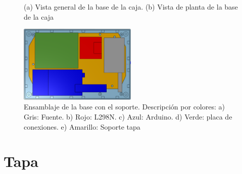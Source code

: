 \newpage

\begin{figure}[htpb]%
    \centering 
    \hspace{10pt}%
    \caption{(a) Vista general de la base de la caja. (b) Vista de planta de la base de la caja}
    \label{fig:cajabase} 
\end{figure} 


\begin{figure}[hbtp]
    \centering
    \includegraphics[width=0.5\textwidth]{04-caja/ensamblajebase.png}
    \caption{Ensamblaje de la base con el soporte. Descripción por colores: a) Gris: Fuente. 
    b) Rojo: L298N. c) Azul: Arduino. d) Verde: placa de conexiones. e) Amarillo: Soporte tapa}
    \label{fig:ensamblajebase}
    \end{figure}


\section{Tapa}

